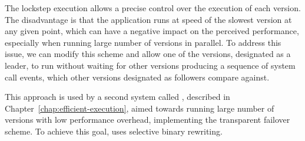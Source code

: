 The lockstep execution allows a precise control over the execution of each
version. The disadvantage is that the application runs at speed of the slowest
version at any given point, which can have a negative impact on the perceived
performance, especially when running large number of versions in parallel. To
address this issue, we can modify this scheme and allow one of the versions,
designated as a leader, to run without waiting for other versions producing a
sequence of system call events, which other versions designated as followers
compare against.

This approach is used by a second system called \varan, described in
Chapter~\ref{chap:efficient-execution}, aimed towards running large number of
versions with low performance overhead, implementing the transparent failover
scheme. To achieve this goal, \varan uses selective binary rewriting.


